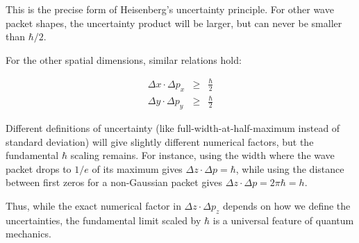 \documentclass[
  a4paper,
]{book}
\begin{document}
This is the precise form of Heisenberg's uncertainty principle. For
other wave packet shapes, the uncertainty product will be larger, but
can never be smaller than \(\hbar/2\).

For the other spatial dimensions, similar relations hold:

\[
\begin{aligned}
\Delta x \cdot \Delta p_x  & \ge & \frac{\hbar}{2}\\
\Delta y \cdot \Delta p_y  & \ge & \frac{\hbar}{2}
\end{aligned}
\]

Different definitions of uncertainty (like full-width-at-half-maximum
instead of standard deviation) will give slightly different numerical
factors, but the fundamental \(\hbar\) scaling remains. For instance,
using the width where the wave packet drops to \(1/e\) of its maximum
gives \(\Delta z \cdot \Delta p = \hbar\), while using the distance
between first zeros for a non-Gaussian packet gives
\(\Delta z \cdot \Delta p = 2\pi\hbar = h\).

Thus, while the exact numerical factor in \(\Delta z \cdot \Delta p_z\)
depends on how we define the uncertainties, the fundamental limit scaled
by \(\hbar\) is a universal feature of quantum mechanics.
\end{document}
